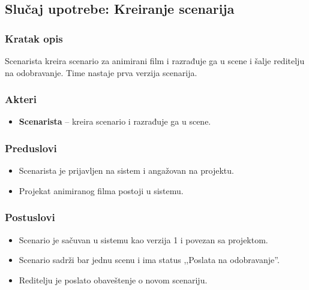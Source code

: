\subsection{Slučaj upotrebe: Kreiranje scenarija}

\subsubsection*{Kratak opis}

Scenarista kreira scenario za animirani film i razrađuje ga u scene i šalje reditelju na odobravanje. Time nastaje prva verzija scenarija.

\subsubsection*{Akteri}
\begin{itemize}
    \item \textbf{Scenarista} -- kreira scenario i razrađuje ga u scene.
    
\end{itemize}

\subsubsection*{Preduslovi}
\begin{itemize}
    \item Scenarista je prijavljen na sistem i angažovan na projektu.
    \item Projekat animiranog filma postoji u sistemu.
\end{itemize}

\subsubsection*{Postuslovi}

\begin{itemize}
    \item Scenario je sačuvan u sistemu kao verzija 1 i povezan sa projektom.
    \item Scenario sadrži bar jednu scenu i ima status ,,Poslata na odobravanje''.
    \item Reditelju je poslato obaveštenje o novom scenariju.
    
\end{itemize}

